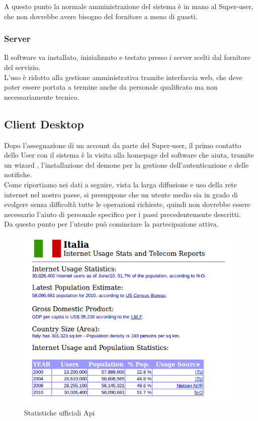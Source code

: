 A questo punto la normale amministrazione del sistema è in mano al Super-user, che non dovrebbe avere bisogno del fornitore a meno di guasti.

\subsubsection{Server}
Il software va installato, inizializzato e testato presso i server scelti dal 	fornitore del servizio.\\
L’uso è ridotto alla gestione amministrativa tramite interfaccia web, che deve poter essere portata a termine anche da personale qualificato ma non necessariamente tecnico.\\

\newpage

\subsection{Client Desktop}
Dopo l’assegnazione di un account da parte del Super-user, il primo contatto dello User con il sistema è la visita alla homepage del software che aiuta, tramite un wizard , l’installazione del demone per la gestione dell’autenticazione e delle notifiche.\\
Come riportiamo nei dati a seguire, vista la larga diffusione e uso della rete internet nel nostro paese, si presuppone che un utente medio sia in grado di svolgere senza difficoltà tutte le operazioni richieste, quindi non dovrebbe essere necessario l’aiuto di personale specifico per i passi precedentemente descritti.\\
Da questo punto per l’utente può cominciare la partecipazione attiva.\\


\begin{figure}[H]
\centering
\caption{Statistiche ufficiali Api}
\includegraphics[scale=0.55]{images/statItaly} 
\end{figure}

